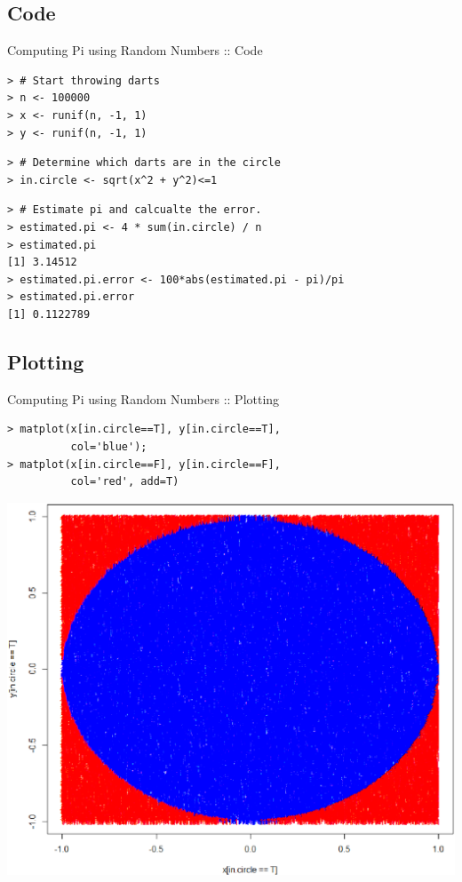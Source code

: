 \documentclass{beamer}
\begin{document}
\subsection{Code}

\begin{frame}[fragile]{Computing Pi using Random Numbers :: Code}

\begin{verbatim}
> # Start throwing darts
> n <- 100000
> x <- runif(n, -1, 1)
> y <- runif(n, -1, 1)
\end{verbatim}

\begin{verbatim}
> # Determine which darts are in the circle
> in.circle <- sqrt(x^2 + y^2)<=1
\end{verbatim}

\begin{verbatim}
> # Estimate pi and calcualte the error.
> estimated.pi <- 4 * sum(in.circle) / n
> estimated.pi
[1] 3.14512
> estimated.pi.error <- 100*abs(estimated.pi - pi)/pi
> estimated.pi.error
[1] 0.1122789
\end{verbatim}

\end{frame}

\subsection{Plotting}

\begin{frame}[fragile]{Computing Pi using Random Numbers :: Plotting}

\begin{verbatim}
> matplot(x[in.circle==T], y[in.circle==T],
          col='blue');
> matplot(x[in.circle==F], y[in.circle==F],
          col='red', add=T)
\end{verbatim}

\includegraphics[scale=0.19]{dartboard.eps}

\end{frame}
\end{document}
